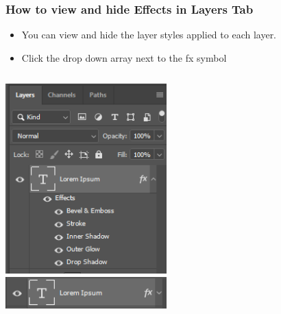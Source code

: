 \documentclass{beamer}
\begin{document}
	\begin{frame}
	\frametitle{How to view and hide Effects in Layers Tab}
	\begin{itemize}
		\item You can view and hide the layer styles applied to each layer.
		\item Click the drop down array next to the fx symbol
	\end{itemize}
	\begin{center}
		\begin{columns}
		\includegraphics[width = 0.5\textwidth]{images/effects.png}
		\includegraphics[width = 0.5\textwidth]{images/effects2.png}
	\end{columns}
	\end{center}
\end{frame}
\end{document}
